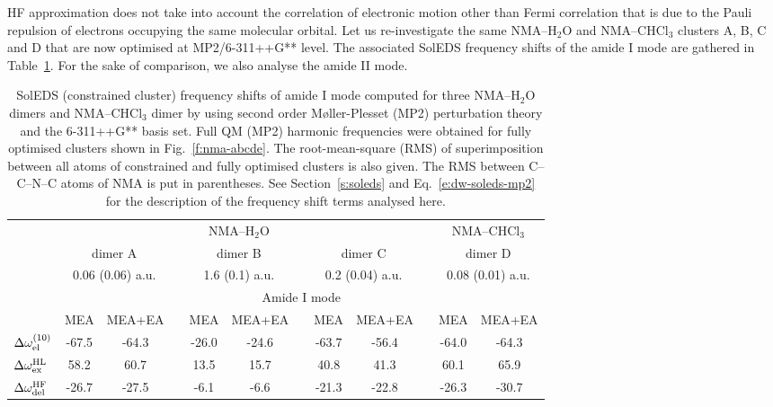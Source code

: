 \documentclass[a4paper,titlepage,twoside,fleqn,12pt]{book}
\begin{document}
\begin{refsection}
HF approximation does not take into account the correlation
of electronic motion other than Fermi correlation
that is due to the Pauli repulsion of electrons occupying the same
molecular orbital. Let us re-investigate the same NMA--H$_2$O
and NMA--CHCl$_3$ clusters A, B, C and D that are now optimised
at MP2/6-311++G** level. The associated SolEDS frequency shifts
of the amide I mode are gathered in Table~\ref{t:mp2-soleds-amide-I}.
For the sake of comparison, we also analyse the amide II mode.
%
\begin{table}[t!]
\caption{
SolEDS (constrained cluster) frequency shifts of amide I mode computed for three NMA--H$_2$O dimers 
and NMA--CHCl$_3$ dimer by using second
order M{\o}ller-Plesset (MP2) perturbation theory and the 6-311++G** basis set. 
Full QM (MP2) harmonic
frequencies were obtained for fully optimised clusters shown in Fig.~\ref{f:nma-abcde}. 
The root\hyp{}mean\hyp{}square (RMS) of
superimposition between all atoms of constrained and fully optimised clusters is also given. The RMS between
C--C--N--C atoms of NMA is put in parentheses. See Section~\ref{s:soleds} and Eq.~\eqref{e:dw-soleds-mp2}
for the description of the frequency shift terms analysed here.
\label{t:mp2-soleds-amide-I}}
\begin{tabular*}{1.0\textwidth}{@{\extracolsep{\fill} } l ccccccccccc }
\hline\hline
 & \multicolumn{8}{c}{NMA--H$_2$O} && \multicolumn{2}{c}{NMA--CHCl$_3$} \\
\cline{2-9}
\cline{11-12}
 & \multicolumn{2}{c}{dimer A} && 
    \multicolumn{2}{c}{dimer B} && 
    \multicolumn{2}{c}{dimer C} && 
    \multicolumn{2}{c}{dimer D} \\
 & \multicolumn{2}{c}{0.06 (0.06) a.u.} && 
    \multicolumn{2}{c}{1.6 (0.1) a.u.}   && 
    \multicolumn{2}{c}{0.2 (0.04) a.u.}  && 
    \multicolumn{2}{c}{0.08 (0.01) a.u.} \\
\cline{2-12}
 & \multicolumn{11}{c}{Amide I mode} \\
\cline{2-12}
 & MEA & MEA+EA &&  MEA & MEA+EA && MEA & MEA+EA && MEA & MEA+EA \\
\hline
 $\Delta \omega_{{\rm el}}^{(10)}$      & -67.5  & -64.3   && -26.0  & -24.6   && -63.7  & -56.4  && -64.0 & -64.3 \\
 $\Delta \omega_{{\rm ex}}^{\rm HL}$    &  58.2  &  60.7   &&  13.5  &  15.7   &&  40.8  &  41.3  &&  60.1 &  65.9 \\
 $\Delta \omega_{{\rm del}}^{\rm HF}$   & -26.7  & -27.5   &&  -6.1  &  -6.6   && -21.3  & -22.8  && -26.3 & -30.7 \\

\end{tabular*}
\end{table}
\end{refsection}
\end{document}
